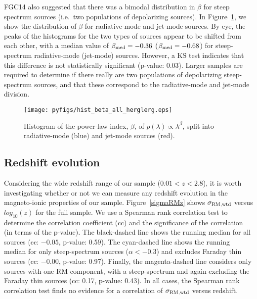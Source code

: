 \documentclass{mnras}
\newcommand*\sigmaRMwtd{\sigma_{\rm RM, wtd}}
\begin{document}
FGC14 also suggested that there was a bimodal distribution in $\beta$ for steep spectrum sources (i.e.~two populations of depolarizing sources). In Figure~\ref{histbeta}, we show the distribution of $\beta$ for radiative-mode and jet-mode sources. By eye, the peaks of the histograms for the two types of sources appear to be shifted from each other, with a median value of $\beta_{\rm med} = -0.36$ ($\beta_{\rm med} = -0.68$) for steep-spectrum radiative-mode (jet-mode) sources. However, a KS test indicates that this difference is not statistically significant (p-value: 0.03). Larger samples are required to determine if there really are two populations of depolarizing steep-spectrum sources, and that these correspond to the radiative-mode and jet-mode division. 

\begin{figure} 
\centering
    \texttt{[image: pyfigs/hist\_beta\_all\_herglerg.eps]} 
    \caption{ {\small Histogram of the power-law index, $\beta$, of $p(\lambda)\propto\lambda^\beta$, split into radiative-mode (blue) and 
    jet-mode sources (red). } }
    \label{histbeta}
\end{figure}  


\subsection{Redshift evolution} \label{sec_z}
Considering the wide redshift range of our sample ($0.01 < z < 2.8$), it is worth investigating whether or not we can measure any redshift evolution in the magneto-ionic properties of our sample. Figure~\ref{sigmaRMz} shows $\sigmaRMwtd$ versus $log_{10}(z)$ for the full sample. 
We use a Spearman rank correlation test to determine the correlation coefficient (cc) and the significance of the correlation (in terms of the p-value). 
The black-dashed line shows the running median for all sources (cc: $-0.05$, p-value: 0.59). The cyan-dashed line shows the running median for only steep-spectrum sources ($\alpha < -0.3$) and excludes Faraday thin sources (cc: $-0.00$, p-value: 0.97). 
Finally, the magenta-dashed line considers only sources with one RM component, with a steep-spectrum and again excluding the Faraday thin sources (cc: 0.17, p-value: 0.43). 
In all cases, the Spearman rank correlation test finds no evidence for a correlation of $\sigmaRMwtd$ versus redshift. 
\end{document}
